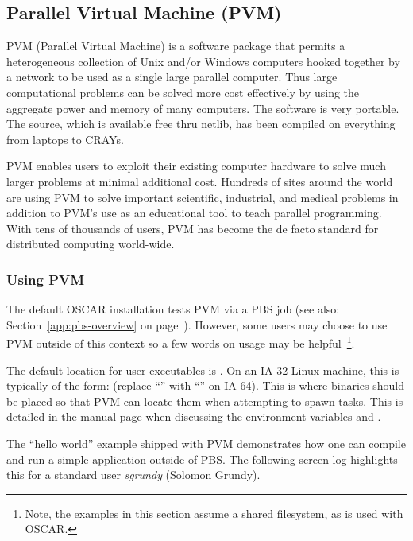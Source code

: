 %
%
%

\subsection{Parallel Virtual Machine (PVM)}
\label{app:pvm-overview}

PVM (Parallel Virtual Machine) is a software package that permits a
heterogeneous collection of Unix and/or Windows computers hooked
together by a network to be used as a single large parallel computer.
Thus large computational problems can be solved more cost effectively
by using the aggregate power and memory of many computers. The
software is very portable. The source, which is available free thru
netlib, has been compiled on everything from laptops to CRAYs.

PVM enables users to exploit their existing computer hardware to solve
much larger problems at minimal additional cost. Hundreds of sites
around the world are using PVM to solve important scientific,
industrial, and medical problems in addition to PVM's use as an
educational tool to teach parallel programming. With tens of thousands
of users, PVM has become the de facto standard for distributed
computing world-wide.

\subsubsection{Using PVM}
\label{app:pvm-usage}

The default OSCAR installation tests PVM via a PBS job (see also:
Section~\ref{app:pbs-overview} on page~\pageref{app:pbs-overview}).
However, some users may choose to use PVM outside of this context so a
few words on usage may be helpful~\footnote{Note, the examples in this
  section assume a shared filesystem, as is used with OSCAR.}.

The default location for user executables is
.  On an IA-32 Linux machine, this
is typically of the form:  (replace
``'' with ``'' on IA-64).  This is where
binaries should be placed so that PVM can locate them when attempting
to spawn tasks.  This is detailed in the 
manual page when discussing the environment variables 
and .

The ``hello world'' example shipped with PVM demonstrates how one can
compile and run a simple application outside of PBS.  The following
screen log highlights this for a standard user \emph{sgrundy} (Solomon
Grundy).

